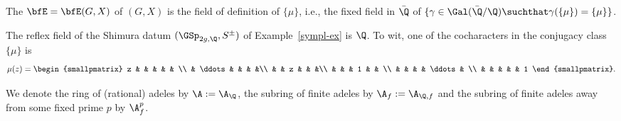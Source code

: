 \documentclass[a4paper]{scrartcl} %
\numberwithin{equation}{section}
\begin{document}
\begin{Definition}
  The  $\bfE=\bfE(G,X)$ of $(G,X)$ is the field of definition of $\{\mu\}$, i.e., the fixed field in $\bar\Q$ of $\{\gamma\in\Gal(\bar\Q/\Q) \suchthat \gamma(\{\mu\})=\{\mu\}\}$.
\end{Definition}


\begin{Example}
  The reflex field of the Shimura datum $(\GSp_{2g,\Q},S^\pm)$ of Example~\ref{sympl-ex} is $\Q$. To wit, one of the cocharacters in the conjugacy class $\{\mu\}$ is
  \begin{equation*}
    \mu(z) =
    \begin{smallpmatrix}
      z & & & & & \\
    & \ddots & & & &\\
    & & z & & &\\
    & & & 1 & &  \\
    & & & & \ddots & \\
    & & & & & 1
    \end{smallpmatrix}.
  \end{equation*}
\end{Example}

\begin{Notation}
We denote the ring of (rational) adeles by $\A:=\A_\Q$, the subring of finite adeles by $\A_f:=\A_{\Q,f}$ and the subring of finite adeles away from some fixed prime $p$ by $\A_f^p$.
\end{Notation}
\end{document}
